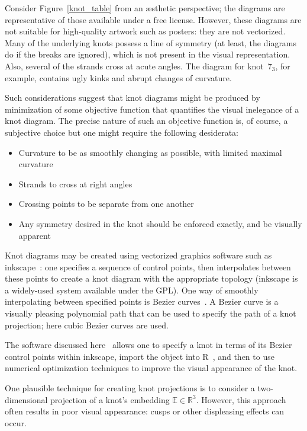 \documentclass{birkjour}
\theoremstyle{definition}
\theoremstyle{remark}
\numberwithin{equation}{section}
\begin{document}
Consider Figure~\ref{knot_table} from an \ae sthetic perspective; the
diagrams are representative of those available under a free license.
However, these diagrams are not suitable for high-quality artwork such
as posters: they are not vectorized.  Many of the underlying knots
possess a line of symmetry (at least, the diagrams do if the breaks
are ignored), which is not present in the visual representation.
Also, several of the strands cross at acute angles.  The diagram for
knot~$7_3$, for example, contains ugly kinks and abrupt changes of
curvature.

Such considerations suggest that knot diagrams might be produced by
minimization of some objective function that quantifies the visual
inelegance of a knot diagram.  The precise nature of such an objective
function is, of course, a subjective choice but one might require the
following desiderata:

\begin{itemize}
\item Curvature to be as smoothly changing as possible, with limited maximal curvature
\item Strands to cross at right angles
\item Crossing points to be separate from one another
\item Any symmetry desired in the knot should be enforced exactly, and be visually apparent
\end{itemize}

Knot diagrams may be created using vectorized graphics software such
as inkscape~\cite{Inkscape}: one specifies a sequence of control
points, then interpolates between these points to create a knot
diagram with the appropriate topology (inkscape is a widely-used
system available under the GPL).  One way of smoothly interpolating
between specified points is Bezier curves~\cite{olsen2014}.  A Bezier
curve is a visually pleasing polynomial path that can be used to
specify the path of a knot projection; here cubic Bezier curves are
used.

The software discussed here~\cite{hankin2020} allows one to specify a
knot in terms of its Bezier control points within inkscape, import the
object into R~\cite{rcore2021}, and then to use numerical optimization
techniques to improve the visual appearance of the knot.

One plausible technique for creating knot projections is to consider a
two-dimensional projection of a knot's embedding
$\mathbb{E}\in\mathbb{R}^3$.  However, this approach often results in
poor visual appearance: cusps or other displeasing effects can occur.
\end{document}
